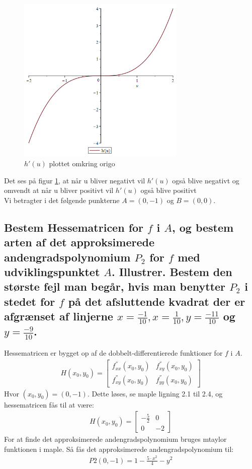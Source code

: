 \begin{figure}[htp]
    \centering
    \includegraphics[width=8cm]{diffh.png}
        \caption{$h'(u)$ plottet omkring origo}
    \label{diffh}
\end{figure}
\newpage

Det ses på figur \ref{diffh}, at når u bliver negativt vil $h'(u)$ også blive negativt og omvendt at når u bliver positivt vil $h'(u)$ også blive positivt
\\
Vi betragter i det følgende punkterne $A = (0,-1)$ og $B=(0,0)$.

\subsection{Bestem Hessematricen for $f$ i $A$, og bestem arten af det approksimerede andengradspolynomium $P_2$ for $f$ med udviklingspunktet $A$. Illustrer. Bestem den største fejl man begår, hvis man benytter $P_2$ i stedet for $f$ på det afsluttende kvadrat der er afgrænset af linjerne $x=\frac{-1}{10},x=\frac{1}{10},y=\frac{-11}{10}$ og $y=\frac{-9}{10}$.}

Hessematricen er bygget op af de dobbelt-differentierede funktioner for $f$ i $A$. 
\begin{align}
    H(x_0,y_0)= 
    \left[
    \begin{array}{cc}
        f^{''}_{xx}(x_0,y_0) & f^{''}_{xy}(x_0,y_0)\\f^{''}_{xy}(x_0,y_0) & f^{''}_{yy}(x_0,y_0)
    \end{array}
\right] 
\end{align}
Hvor $(x_0,y_0)=(0,-1)$.
Dette løses, se maple ligning 2.1 til 2.4, og hessematricen fås til at være:
\begin{align}
    H(x_0,y_0)= 
    \left[
    \begin{array}{cc}
        -\frac{5}{2} & 0\\0 & -2
    \end{array}
\right] 
\end{align}
For at finde det approksimerede andengradspolynomium bruges mtaylor funktionen i maple. Så fås det approksimerede andengradspolynomium til:
\begin{align}
    P2(0,-1) = 1-\frac{5\cdot x^2}{4} - y^2
\end{align}

